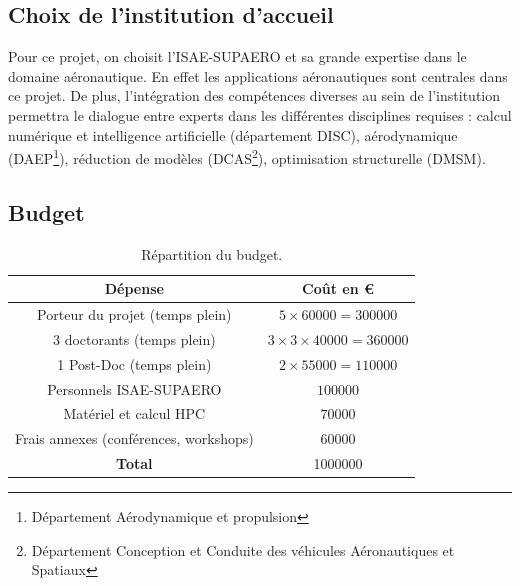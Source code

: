 \documentclass[12pt, french]{article}
\begin{document}
	
	\subsection{Choix de l'institution d'accueil}
	Pour ce projet, on choisit l'ISAE-SUPAERO et sa grande expertise dans le domaine aéronautique. En effet les applications aéronautiques sont centrales dans ce projet. De plus, l'intégration des compétences diverses au sein de l'institution permettra le dialogue entre experts dans les différentes disciplines requises : calcul numérique et intelligence artificielle (département DISC), aérodynamique (DAEP\footnote{Département Aérodynamique et propulsion}), réduction de modèles (DCAS\footnote{Département Conception et Conduite des véhicules Aéronautiques et Spatiaux}), optimisation structurelle (DMSM).
	
	
\subsection{Budget}

\begin{table}[h]
\centering
\begin{tabular}{|c|c|}
	\hline
	D\'epense & Co\^{u}t en \euro \\
	\hline
	Porteur du projet (temps plein) & $5\times 60000=300000$ \\
	3 doctorants (temps plein) & $3\times 3\times 40000=360000$  \\
	1 Post-Doc (temps plein) & $2\times 55000=110000$ \\
	Personnels ISAE-SUPAERO & $100000$ \\
	Matériel  et calcul HPC & $70000$ \\
	Frais annexes (conférences, workshops) & $60000$ \\
	\hline
	\textbf{Total} & 1000000 \\
	\hline
\end{tabular}
\caption{Répartition du budget.}
\end{table}
\end{document}

